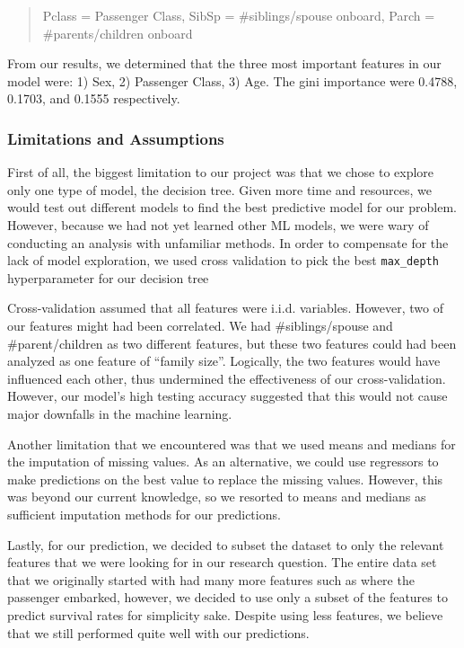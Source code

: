 \documentclass[]{article}
\begin{document}
\begin{quote}
Pclass = Passenger Class, SibSp = \#siblings/spouse onboard, Parch =
\#parents/children onboard
\end{quote}

From our results, we determined that the three most important features
in our model were: 1) Sex, 2) Passenger Class, 3) Age. The gini
importance were 0.4788, 0.1703, and 0.1555 respectively.

\subsubsection{Limitations and
Assumptions}\label{limitations-and-assumptions}

First of all, the biggest limitation to our project was that we chose to
explore only one type of model, the decision tree. Given more time and
resources, we would test out different models to find the best
predictive model for our problem. However, because we had not yet
learned other ML models, we were wary of conducting an analysis with
unfamiliar methods. In order to compensate for the lack of model
exploration, we used cross validation to pick the best
\texttt{max\_depth} hyperparameter for our decision tree

Cross-validation assumed that all features were i.i.d. variables.
However, two of our features might had been correlated. We had
\#siblings/spouse and \#parent/children as two different features, but
these two features could had been analyzed as one feature of ``family
size''. Logically, the two features would have influenced each other,
thus undermined the effectiveness of our cross-validation. However, our
model's high testing accuracy suggested that this would not cause major
downfalls in the machine learning.

Another limitation that we encountered was that we used means and
medians for the imputation of missing values. As an alternative, we
could use regressors to make predictions on the best value to replace
the missing values. However, this was beyond our current knowledge, so
we resorted to means and medians as sufficient imputation methods for
our predictions.

Lastly, for our prediction, we decided to subset the dataset to only the
relevant features that we were looking for in our research question. The
entire data set that we originally started with had many more features
such as where the passenger embarked, however, we decided to use only a
subset of the features to predict survival rates for simplicity sake.
Despite using less features, we believe that we still performed quite
well with our predictions.
\end{document}
